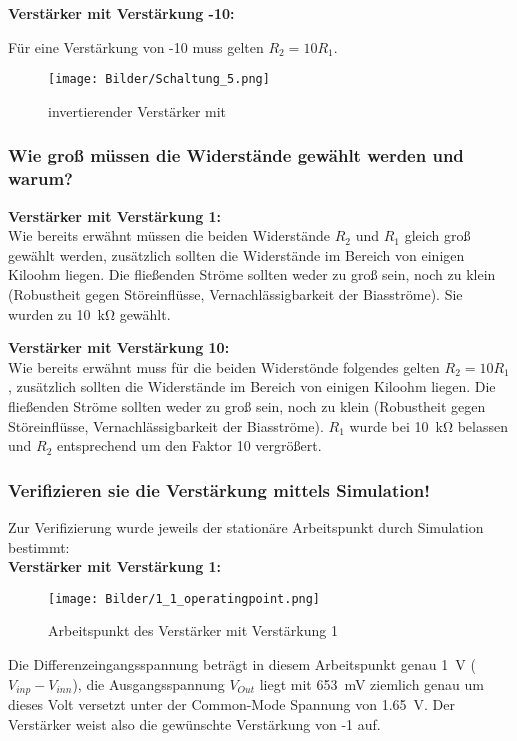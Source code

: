 \textbf{Verstärker mit Verstärkung -10:}

Für eine Verstärkung von -10 muss gelten $R_2 = 10 R_1$.

\begin{figure}[H]
    \centering
    \texttt{[image: Bilder/Schaltung\_5.png]}
    \caption{invertierender Verstärker mit }
    \label{fig:my_label}
\end{figure}

\subsubsection{Wie groß müssen die Widerstände gewählt werden und warum?}
\textbf{Verstärker mit Verstärkung 1:}\\
Wie bereits erwähnt müssen die beiden Widerstände $R_2$ und $R_1$ gleich groß gewählt werden, zusätzlich sollten die Widerstände im Bereich von einigen Kiloohm liegen. Die fließenden Ströme sollten weder zu groß sein, noch zu klein (Robustheit gegen Störeinflüsse, Vernachlässigbarkeit der Biasströme). Sie wurden zu \SI{10}{\kilo \ohm} gewählt.

\textbf{Verstärker mit Verstärkung 10:}\\
Wie bereits erwähnt muss für die beiden Widerstönde folgendes gelten $R_2= 10 R_1$, zusätzlich sollten die Widerstände im Bereich von einigen Kiloohm liegen. Die fließenden Ströme sollten weder zu groß sein, noch zu klein (Robustheit gegen Störeinflüsse, Vernachlässigbarkeit der Biasströme). $R_1$ wurde bei \SI{10}{\kilo \ohm} belassen und $R_2$ entsprechend um den Faktor 10 vergrößert.

\subsubsection{Verifizieren sie die Verstärkung mittels Simulation!}

Zur Verifizierung wurde jeweils der stationäre Arbeitspunkt durch Simulation bestimmt:\\
\textbf{Verstärker mit Verstärkung 1:}\\

\begin{figure}[H]
    \centering
    \texttt{[image: Bilder/1\_1\_operatingpoint.png]}
    \caption{Arbeitspunkt des Verstärker mit Verstärkung 1}
    \label{fig:my_label}
\end{figure}

Die Differenzeingangsspannung beträgt in diesem Arbeitspunkt genau \SI{1}{\volt} ($V_{inp}-V_{inn}$), die Ausgangsspannung $V_{Out}$ liegt mit \SI{653}{\milli \volt} ziemlich genau um dieses Volt versetzt unter der Common-Mode Spannung von \SI{1.65}{\volt}. Der Verstärker weist also die gewünschte Verstärkung von -1 auf.

